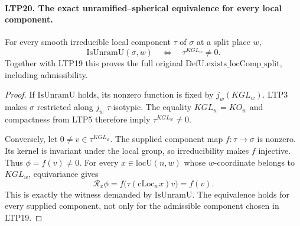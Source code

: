 \documentclass[11pt,a4paper]{article}
\numberwithin{equation}{section}
\theoremstyle{remark}\newtheorem{remark}[theorem]{Remark}
\begin{document}
\paragraph{LTP20. The exact unramified--spherical equivalence for every local component.}
\label{claim:LTP20}
For every smooth irreducible local component \(\tau\) of
\(\sigma\) at a split place \(w\),
\[
            \mathrm{IsUnramU}(\sigma,w)
                 \quad\Longleftrightarrow\quad
                   \tau^{KGL_w}\ne0 .
\]
Together with LTP19 this proves the full original
\(\mathrm{DefU.exists\_\allowbreak locComp\_\allowbreak split}\), including admissibility.
\begin{proof}
If \(\mathrm{IsUnramU}\) holds, its nonzero function is fixed
by \(j_w(KGL_w)\).  LTP3 makes \(\sigma\) restricted along
\(j_w\) \(\tau\)-isotypic.  The equality \(KGL_w=KO_w\) and
compactness from LTP5 therefore imply \(\tau^{KGL_w}\ne0\).

Conversely, let \(0\ne v\in\tau^{KGL_w}\).
The supplied component map \(f:\tau\to\sigma\) is nonzero.
Its kernel is invariant under the local group, so irreducibility
makes \(f\) injective.  Thus \(\phi=f(v)\ne0\).
For every \(x\in\mathrm{locU}(n,w)\) whose \(w\)-coordinate
belongs to \(KGL_w\), equivariance gives
\[
       \mathscr R_x\phi
                   =f\bigl(\tau(\mathrm{cLoc}_w x)v\bigr)
                   =f(v).
\]
This is exactly the witness demanded by \(\mathrm{IsUnramU}\).
The equivalence holds for every supplied component, not only
for the admissible component chosen in LTP19.
\end{proof}

\end{document}
